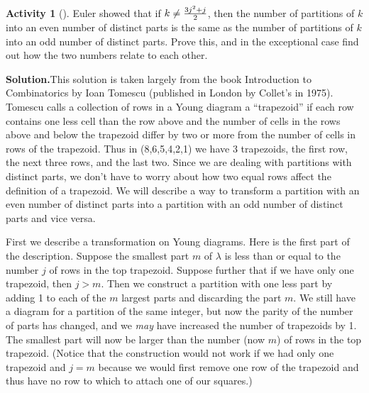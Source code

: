 \documentclass[10pt,]{book}
\theoremstyle{plain}
\theoremstyle{definition}
\newtheorem{activity}[project]{Activity}
\numberwithin{equation}{chapter}
\begin{document}
\begin{activity}[]\label{activity-63}
Euler showed that if \(k\not= {3j^2+j\over 2}\), then the number of partitions of \(k\) into an even number of distinct parts is the same as the number of partitions of \(k\) into an odd number of distinct parts. Prove this, and in the exceptional case find out how the two numbers relate to each other.%
\par\medskip\noindent%
\textbf{Solution.}\quad This solution is taken largely from the book Introduction to Combinatorics by Ioan Tomescu (published in London by Collet's in 1975). Tomescu calls a collection of rows in a Young diagram a ``trapezoid'' if each row contains one less cell than the row above and the number of cells in the rows above and below the trapezoid differ by two or more from the number of cells in rows of the trapezoid. Thus in (8,6,5,4,2,1) we have 3 trapezoids, the first row, the next three rows, and the last two. Since we are dealing with partitions with distinct parts, we don't have to worry about how two equal rows affect the definition of a trapezoid. We will describe a way to transform a partition with an even number of distinct parts into a partition with an odd number of distinct parts and vice versa.%
\par
First we describe a transformation on Young diagrams. Here is the first part of the description. Suppose the smallest part \(m\) of \(\lambda\) is less than or equal to the number \(j\) of rows in the top trapezoid. Suppose further that if we have only one trapezoid, then \(j>m\). Then we construct a partition with one less part by adding 1 to each of the \(m\) largest parts and discarding the part \(m\). We still have a diagram for a partition of the same integer, but now the parity of the number of parts has changed, and we \emph{may} have increased the number of trapezoids by 1. The smallest part will now be larger than the number (now \(m\)) of rows in the top trapezoid. (Notice that the construction would not work if we had only one trapezoid and \(j=m\) because we would first remove one row of the trapezoid and thus have no row to which to attach one of our squares.)%
\par

\end{activity}
\end{document}
